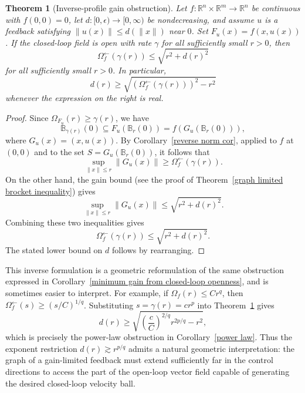 \documentclass[pdflatex,sn-mathphys-num]{sn-jnl}%
\theoremstyle{thmstyleone}%
\newtheorem{theorem}{Theorem}%
\theoremstyle{thmstyletwo}%
\theoremstyle{thmstylethree}%
\begin{document}

    \begin{theorem}[Inverse-profile gain obstruction]\label{inverse profile obstruction}
        Let $f:\mathbb{R}^n\times\mathbb{R}^m\rightarrow \mathbb{R}^n$ be continuous with $f(0,0)=0$, let \(d:[0,\epsilon)\to[0,\infty)\) be nondecreasing, and assume $u$ is a feedback satisfying $\|u(x)\|\leq d(\|x\|)$ near $0$.  Set $F_u(x)=f(x,u(x))$.  If the closed-loop field is open with rate $\gamma$ for all sufficiently small $r>0$, then
        $$
            \Omega_f^{\leftarrow}(\gamma(r))\leq \sqrt{r^2+d(r)^2}
        $$
        for all sufficiently small $r>0$.  In particular,
        $$
            d(r)\geq \sqrt{\left(\Omega_f^{\leftarrow}(\gamma(r))\right)^2-r^2}
        $$
        whenever the expression on the right is real.
    \end{theorem}


    \begin{proof}
        Since $\Omega_{F_u}(r)\geq \gamma(r)$, we have
        $$
            \mathbb{B}_{\gamma(r)}(0)\subseteq F_u(\mathbb{B}_r(0))=f(G_u(\mathbb{B}_r(0))),
        $$
        where $G_u(x)=(x,u(x))$.  By Corollary~\ref{reverse norm cor}, applied to $f$ at $(0,0)$ and to the set $S=G_u(\mathbb{B}_r(0))$, it follows that
        $$
            \sup_{\|x\|\leq r}\|G_u(x)\|\geq \Omega_f^{\leftarrow}(\gamma(r)).
        $$
        On the other hand, the gain bound (see the proof of Theorem~\ref{graph limited brocket inequality}) gives
        $$
            \sup_{\|x\|\leq r}\|G_u(x)\|\leq \sqrt{r^2+d(r)^2}.
        $$
        Combining these two inequalities gives
        $$
            \Omega_f^{\leftarrow}(\gamma(r))\leq \sqrt{r^2+d(r)^2}.
        $$
        The stated lower bound on $d$ follows by rearranging.
    \end{proof}

    This inverse formulation is a geometric reformulation of the same obstruction expressed in  Corollary~\ref{minimum gain from closed-loop openness}, and is sometimes easier to interpret.  For example, if $\Omega_f(r)\leq Cr^q$, then $\Omega_f^{\leftarrow}(s)\geq (s/C)^{1/q}$.  Substituting $s=\gamma(r)=cr^p$ into Theorem~\ref{inverse profile obstruction} gives
    $$
        d(r)\geq \sqrt{\left(\frac{c}{C}\right)^{2/q}r^{2p/q}-r^2},
    $$
    which is precisely the power-law obstruction in Corollary~\ref{power law}.  Thus the exponent restriction $d(r)\gtrsim r^{p/q}$ admits a natural geometric interpretation: the graph of a gain-limited feedback must extend sufficiently far in the control directions to access the part of the open-loop vector field capable of generating the desired closed-loop velocity ball.
\end{document}
